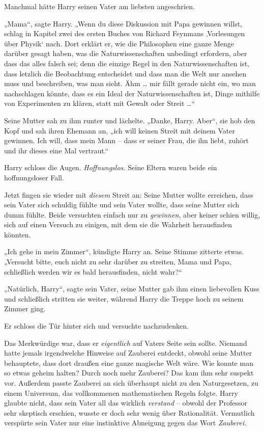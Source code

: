 {Manchmal hätte Harry seinen Vater am liebsten angeschrien.

„Mama“, sagte Harry. „Wenn du diese Diskussion mit Papa gewinnen willst, schlag in Kapitel zwei des ersten Buches von Richard Feynmans ‚Vorlesungen über Physik` nach. Dort erklärt er, wie die Philosophen eine ganze Menge darüber gesagt haben, was die Naturwissenschaften unbedingt erfordern, aber dass das alles falsch sei; denn die einzige Regel in den Naturwissenschaften ist, dass letzlich die Beobachtung entscheidet und dass man die Welt nur ansehen muss und beschreiben, was man sieht. Ähm … mir fällt gerade nicht ein, wo man nachschlagen könnte, dass es ein Ideal der Naturwissenschaften ist, Dinge mithilfe von Experimenten zu klären, statt mit Gewalt oder Streit …“

Seine Mutter sah zu ihm runter und lächelte. „Danke, Harry. Aber“, sie hob den Kopf und sah ihren Ehemann an, „ich will keinen Streit mit deinem Vater gewinnen. Ich will, dass mein Mann -- dass er seiner Frau, die ihn liebt, zuhört und ihr dieses eine Mal vertraut.“

Harry schloss die Augen. \emph{Hoffnungslos.} Seine Eltern waren beide ein hoffnungsloser Fall.

Jetzt fingen sie wieder mit \emph{diesem} Streit an: Seine Mutter wollte erreichen, dass sein Vater sich schuldig fühlte und sein Vater wollte, dass seine Mutter sich dumm fühlte. Beide versuchten einfach nur zu \emph{gewinnen}, aber keiner schien willig, sich auf einen Versuch zu einigen, mit dem sie die Wahrheit herausfinden könnten.

„Ich gehe in mein Zimmer“, kündigte Harry an. Seine Stimme zitterte etwas. „Versucht bitte, euch nicht zu sehr darüber zu streiten, Mama und Papa, schließlich werden wir es bald herausfinden, nicht wahr?“

„Natürlich, Harry“, sagte sein Vater, seine Mutter gab ihm einen liebevollen Kuss und schließlich stritten sie weiter, während Harry die Treppe hoch zu seinem Zimmer ging.

Er schloss die Tür hinter sich und versuchte nachzudenken.

Das Merkwürdige war, dass er \emph{eigentlich} auf Vaters Seite sein sollte. Niemand hatte jemals irgendwelche Hinweise auf Zauberei entdeckt, obwohl seine Mutter behauptete, dass dort draußen eine ganze magische Welt wäre. Wie konnte man so etwas geheim halten? Durch noch mehr Zauberei? Das kam ihm sehr suspekt vor. Außerdem passte Zauberei an sich überhaupt nicht zu den Naturgesetzen, zu einem Universum, das vollkommenen mathematischen Regeln folgte. Harry glaubte nicht, dass sein Vater all das wirklich \emph{verstand} -- obwohl der Professor sehr skeptisch erschien, wusste er doch sehr wenig über Rationalität. Vermutlich verspürte sein Vater nur eine instinktive Abneigung gegen das Wort \emph{Zauberei.}

}
